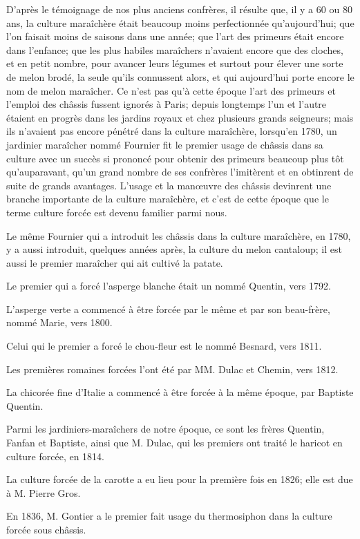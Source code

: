\documentclass[10pt,a4paper]{book}
\begin{document}
D'après le témoignage de nos plus anciens confrères, il résulte que, il y a 60 ou 80 ans, la culture maraîchère était beaucoup moins perfectionnée qu'aujourd'hui; que l'on faisait moins de saisons dans une année; que l'art des primeurs était encore dans l'enfance; que les plus habiles maraîchers n'avaient encore que des cloches, et en petit nombre, pour avancer leurs légumes et surtout pour élever une sorte de melon brodé, la seule qu'ils connussent alors, et qui aujourd'hui porte encore le nom de melon maraîcher. Ce n'est pas qu'à cette époque l'art des primeurs et l'emploi des châssis fussent ignorés à Paris; depuis longtemps l'un et l'autre étaient en progrès dans les jardins royaux et chez plusieurs grands seigneurs; mais ils n'avaient pas encore pénétré dans la culture maraîchère, lorsqu'en 1780, un jardinier maraîcher nommé Fournier fit le premier usage de châssis dans sa culture avec un succès si prononcé pour obtenir des primeurs beaucoup plus tôt qu'auparavant, qu'un grand nombre de ses confrères l'imitèrent et en obtinrent de suite de grands avantages. L'usage et la manœuvre des châssis devinrent une branche importante de la culture maraîchère, et c'est de cette époque que le terme culture forcée est devenu familier parmi nous.

Le même Fournier qui a introduit les châssis dans la culture maraîchère, en 1780, y a aussi introduit, quelques années après, la culture du melon cantaloup; il est aussi le premier maraîcher qui ait cultivé la patate.

Le premier qui a forcé l'asperge blanche était un nommé Quentin, vers 1792.

L'asperge verte a commencé à être forcée par le même et par son beau-frère, nommé Marie, vers 1800.

Celui qui le premier a forcé le chou-fleur est le nommé Besnard, vers 1811.

Les premières romaines forcées l'ont été par MM. Dulac et Chemin, vers 1812.

La chicorée fine d'Italie a commencé à être forcée à la même époque, par Baptiste Quentin.

Parmi les jardiniers-maraîchers de notre époque, ce sont les frères Quentin, Fanfan et Baptiste, ainsi que M. Dulac, qui les premiers ont traité le haricot en culture forcée, en 1814.

La culture forcée de la carotte a eu lieu pour la première fois en 1826; elle est due à M. Pierre Gros.

En 1836, M. Gontier a le premier fait usage du thermosiphon dans la culture forcée sous châssis.
\end{document}
